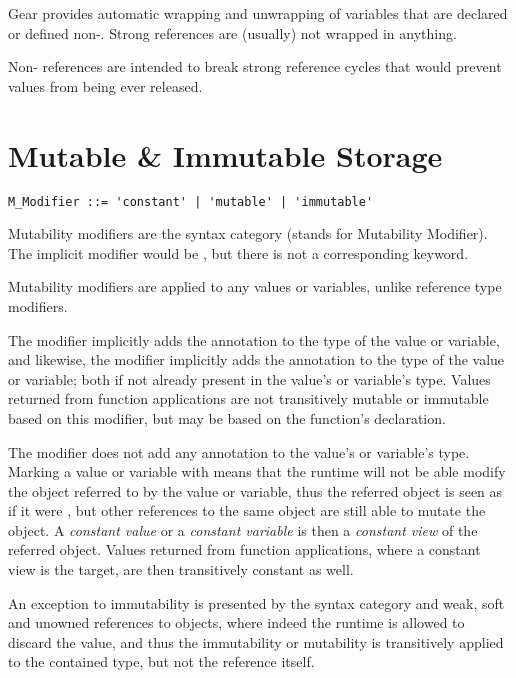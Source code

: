 Gear provides automatic wrapping and unwrapping of variables that are declared or defined non-. Strong references are (usually) not wrapped in anything. 

Non- references are intended to break strong reference cycles that would prevent values from being ever released. 





\section{Mutable \& Immutable Storage}
\label{sec:mutable-immutable-storage}

\syntax\begin{lstlisting}
M_Modifier ::= 'constant' | 'mutable' | 'immutable'
\end{lstlisting}

Mutability modifiers are the syntax category  (stands for Mutability Modifier). The implicit modifier would be , but there is not a corresponding keyword. 

Mutability modifiers are applied to any values or variables, unlike reference type modifiers. 

The  modifier implicitly adds the  annotation to the type of the value or variable, and likewise, the  modifier implicitly adds the  annotation to the type of the value or variable; both if not already present in the value's or variable's type. Values returned from function applications are not transitively mutable or immutable based on this modifier, but may be based on the function's declaration. 

The  modifier does not add any annotation to the value's or variable's type. Marking a value or variable with  means that the runtime will not be able modify the object referred to by the value or variable, thus the referred object is seen as if it were , but other references to the same object are still able to mutate the object. A {\em constant value} or a {\em constant variable} is then a {\em constant view} of the referred object. Values returned from function applications, where a constant view is the target, are then transitively constant as well. 

An exception to immutability is presented by the  syntax category and weak, soft and unowned references to objects, where indeed the runtime is allowed to discard the value, and thus the immutability or mutability is transitively applied to the contained type, but not the reference itself. 






